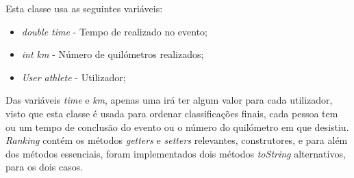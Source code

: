 \documentclass[10pt,notitlepage]{article}
\begin{document}
Esta classe usa as seguintes variáveis:
\begin{itemize}
\item \textit{double time} - Tempo de realizado no evento;
\item \textit{int km} - Número de quilómetros realizados;
\item \textit{User athlete} - Utilizador;
\end{itemize}
Das variáveis \textit{time} e \textit{km}, apenas uma irá ter algum valor para cada utilizador, visto que esta classe é usada para ordenar classificações finais, cada pessoa tem ou um tempo de conclusão do evento ou o número do quilómetro em que desistiu. \textit{Ranking} contém os métodos \textit{getters} e \textit{setters} relevantes, construtores, e para além dos métodos essenciais, foram implementados dois métodos \textit{toString} alternativos, para os dois casos.






    
\end{document}
